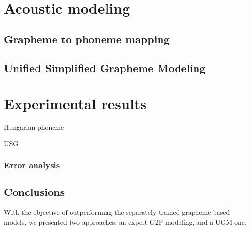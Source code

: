 \documentclass[runningheads,a4paper]{llncs}
\begin{document}
\section{Acoustic modeling}
\subsection{Grapheme to phoneme mapping}\label{g2p}
\subsection{Unified Simplified Grapheme Modeling}\label{usg}
\section{Experimental results}
\begin{table}
\parbox{.45\linewidth}{
\centering
\caption{Hungarian phoneme}

}
\hfill
\parbox{.45\linewidth}{
\centering
\caption{USG}

}
\end{table}
\subsubsection{Error analysis}
\subsection{Conclusions}
With the objective of outperforming the separately trained grapheme-based models, we presented two approaches: an expert G2P modeling, and a UGM one.



\end{document}
